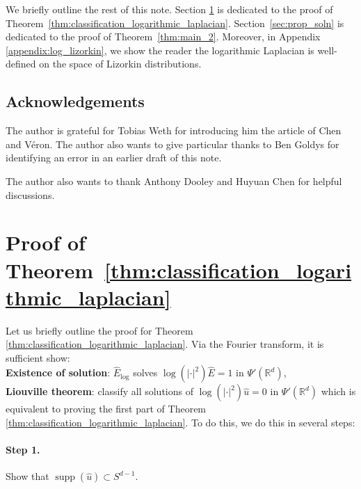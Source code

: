 \documentclass[11pt]{amsart}
\DeclareMathOperator{\supp}{supp}
\newcommand{\R}{\mathbb{R}}
\begin{document}
We briefly outline the rest of this note. Section \ref{sec:derive_fundamental} is dedicated to the proof of Theorem~\ref{thm:classification_logarithmic_laplacian}. Section~\ref{sec:prop_soln} is dedicated to the proof of Theorem~\ref{thm:main_2}. Moreover, in Appendix \ref{appendix:log_lizorkin}, we show the reader the logarithmic Laplacian is well-defined on the space of Lizorkin distributions. 

\subsection{Acknowledgements}

The author is grateful for Tobias Weth for introducing him the article of Chen and V\'eron. The author also wants to give particular thanks to Ben Goldys for identifying an error in an earlier draft of this note.

The author also wants to thank Anthony Dooley and Huyuan Chen for helpful discussions. 

\section{Proof of Theorem~\ref{thm:classification_logarithmic_laplacian}}
\label{sec:derive_fundamental}

Let us briefly outline the proof for Theorem \ref{thm:classification_logarithmic_laplacian}. Via the Fourier transform, it is sufficient show:\\
\textbf{Existence of solution}: $\hat{E}_{\log}$ solves $\log(|\cdot|^2)\hat{E}=1$ in $\Psi'(\R^d)$,\\ 
	\textbf{Liouville theorem}: classify all solutions of $\log(|\cdot|^2)\hat{u}=0$ in $\Psi'(\R^d)$ which is equivalent to proving the first part of Theorem \ref{thm:classification_logarithmic_laplacian}. To do this, we do this in several steps:

	\paragraph{Step 1.} Show that $\supp(\hat{u})\subset S^{d-1}$. 
\end{document}

